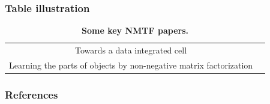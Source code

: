 \documentclass[aspectratio=169]{beamer} %
\begin{document}
\begin{frame}[t]
	\frametitle{Table illustration}

	\begin{table}[htpb]
		\centering
		\begin{tabular}{cc}
			Towards a data integrated cell & \cite{malod2019towards}	\\
			Learning the parts of objects by non-negative matrix factorization & \cite{Lee1999}	
		\end{tabular}
		\caption{{\bf Some key NMTF papers.}}
		\label{tab:table}
	\end{table}	
\end{frame}

\begin{frame}[t, allowframebreaks] %
	\frametitle{References}
	
	\printbibliography

\end{frame}
\end{document}
